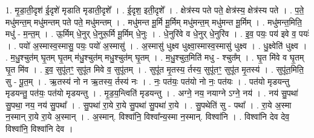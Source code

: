 \documentclass[17pt]{extarticle}
\begin{document}
1. मृ॒डा॒ती॒दृश॑ ई॒दृशे॑ मृडाति मृडाती॒दृशे᳚ । . ई॒दृश॒ इती॒दृशे᳚ । . क्षेत्र॑स्य पते पते॒ क्षेत्र॑स्य॒ क्षेत्र॑स्य पते । . प॒ते॒ मधु॑मन्त॒म् मधु॑मन्तम् पते पते॒ मधु॑मन्तम् । . मधु॑मन्त मू॒र्मि मू॒र्मिम् मधु॑मन्त॒म् मधु॑मन्त मू॒र्मिम् । . मधु॑मन्त॒मिति॒ मधु॑ - म॒न्त॒म् । . ऊ॒र्मिम् धे॒नुर् धे॒नुरू॒र्मि मू॒र्मिम् धे॒नुः । . धे॒नुरि॑वे व धे॒नुर् धे॒नुरि॑व । . इ॒व॒ पयः॒ पय॑ इवे व॒ पयः॑ । . पयो॑ अ॒स्मास्व॒स्मासु॒ पयः॒ पयो॑ अ॒स्मासु॑ । . अ॒स्मासु॑ धुक्ष्व धुक्ष्वा॒स्मास्व॒स्मासु॑ धुक्ष्व । . धु॒क्ष्वेति॑ धुक्ष्व । . म॒धु॒श्चुत॑म् घृ॒तम् घृ॒तम् म॑धु॒श्चुत॑म् मधु॒श्चुत॑म् घृ॒तम् । . म॒धु॒श्चुत॒मिति॑ मधु - श्चुत᳚म् । . घृ॒त मि॑वे व घृ॒तम् घृ॒त मि॑व । . इ॒व॒ सुपू॑तꣳ॒॒ सुपू॑त मिवे व॒ सुपू॑तम् । . सुपू॑त मृ॒तस्य॒ र्तस्य॒ सुपू॑तꣳ॒॒ सुपू॑त मृ॒तस्य॑ । . सुपू॑त॒मिति॒ सु - पू॒त॒म् । . ऋ॒तस्य॑ नो न ऋ॒तस्य॒ र्तस्य॑ नः । . नः॒ पत॑यः॒ पत॑यो नो नः॒ पत॑यः । . पत॑यो मृडयन्तु मृडयन्तु॒ पत॑यः॒ पत॑यो मृडयन्तु । . मृ॒ड॒य॒न्त्विति॑ मृडयन्तु । . अग्ने॒ नय॒ नयाग्ने ऽग्ने॒ नय॑ । . नय॑ सु॒पथा॑ सु॒पथा॒ नय॒ नय॑ सु॒पथा᳚ । . सु॒पथा॑ रा॒ये रा॒ये सु॒पथा॑ सु॒पथा॑ रा॒ये । . सु॒पथेति॑ सु - पथा᳚ । . रा॒ये अ॒स्मा न॒स्मान् रा॒ये रा॒ये अ॒स्मान् । . अ॒स्मान्. विश्वा॑नि॒ विश्वा᳚न्य॒स्मा न॒स्मान्. विश्वा॑नि । . विश्वा॑नि देव देव॒ विश्वा॑नि॒ विश्वा॑नि देव । \newline
\end{document}
